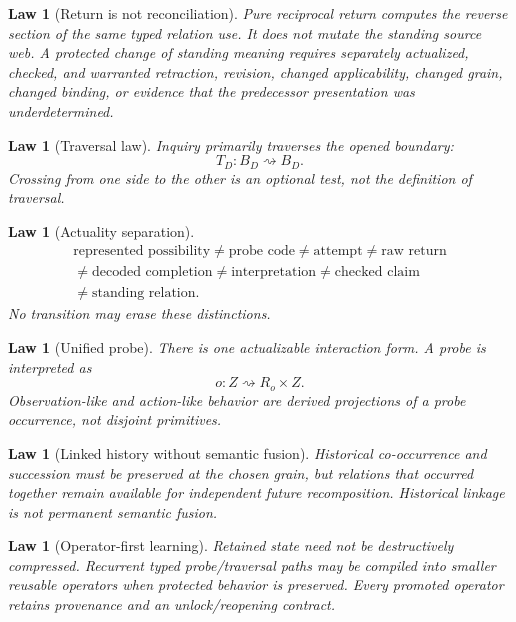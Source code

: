 \documentclass[11pt,oneside]{article}
\newtheorem{law}[definition]{Law}
\begin{document}
\begin{law}[Return is not reconciliation]\label{law:return-not-reconciliation}
Pure reciprocal return computes the reverse section of the same typed relation use.  It does not mutate the standing source web.  A protected change of standing meaning requires separately actualized, checked, and warranted retraction, revision, changed applicability, changed grain, changed binding, or evidence that the predecessor presentation was underdetermined.
\end{law}

\begin{law}[Traversal law]
Inquiry primarily traverses the opened boundary:
\[
\boxed{T_D:B_D\rightsquigarrow B_D.}
\]
Crossing from one side to the other is an optional test, not the definition of traversal.
\end{law}

\begin{law}[Actuality separation]
\[
\boxed{
\begin{gathered}
\text{represented possibility}\neq\text{probe code}\neq\text{attempt}\neq\text{raw return}\\
{}\neq\text{decoded completion}\neq\text{interpretation}\neq\text{checked claim}\\
{}\neq\text{standing relation}.
\end{gathered}
}
\]
No transition may erase these distinctions.
\end{law}

\begin{law}[Unified probe]
There is one actualizable interaction form.  A probe is interpreted as
\[
o:Z\rightsquigarrow R_o\times Z .
\]
Observation-like and action-like behavior are derived projections of a probe occurrence, not disjoint primitives.
\end{law}

\begin{law}[Linked history without semantic fusion]
Historical co-occurrence and succession must be preserved at the chosen grain, but relations that occurred together remain available for independent future recomposition.  Historical linkage is not permanent semantic fusion.
\end{law}

\begin{law}[Operator-first learning]
Retained state need not be destructively compressed.  Recurrent typed probe/traversal paths may be compiled into smaller reusable operators when protected behavior is preserved.  Every promoted operator retains provenance and an unlock/reopening contract.
\end{law}
\end{document}
